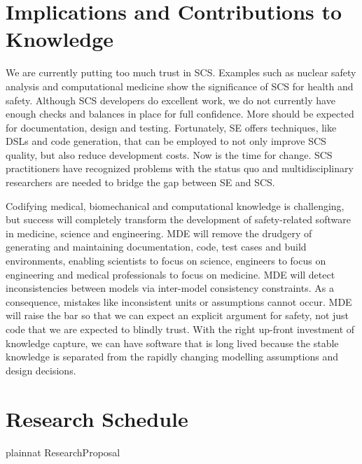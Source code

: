 \documentclass[12pt]{article}
\begin{document}
\section{Implications and Contributions to Knowledge} \label{SecContribKnowledge}

We are currently putting too much trust in SCS.  Examples such as nuclear safety
analysis and computational medicine show the significance of SCS for health and
safety.  Although SCS developers do excellent work, we do not currently have
enough checks and balances in place for full confidence.  More should be
expected for documentation, design and testing.  Fortunately, SE offers
techniques, like DSLs and code generation, that can be employed to not only
improve SCS quality, but also reduce development costs.  Now is the time for
change.  SCS practitioners have recognized problems with the status quo and
multidisciplinary researchers are needed to bridge the gap between SE and SCS.

Codifying medical, biomechanical and computational knowledge is challenging, but
success will completely transform the development of safety-related software in
medicine, science and engineering.  MDE will remove the drudgery of generating
and maintaining documentation, code, test cases and build environments, enabling
scientists to focus on science, engineers to focus on engineering and medical
professionals to focus on medicine.  MDE will detect inconsistencies between
models via inter-model consistency constraints.  As a consequence, mistakes like
inconsistent units or assumptions cannot occur.  MDE will raise the bar so that
we can expect an explicit argument for safety, not just code that we are
expected to blindly trust.  With the right up-front investment of knowledge
capture, we can have software that is long lived because the stable knowledge is
separated from the rapidly changing modelling assumptions and design decisions.

\newpage

\section{Research Schedule} \label{SecSchedule}

 {plainnat}
 {ResearchProposal}
\end{document}
